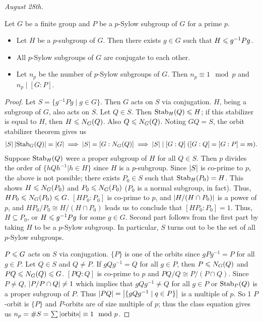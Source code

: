 \textit{August 28th.}

\begin{theorem}
    Let $G$ be a finite group and $P$ be a $p$-Sylow subgroup of $G$ for a prime $p$.
    \begin{itemize}
        \item Let $H$ be a $p$-subgroup of $G$. Then there exists $g \in G$ such that $H \leqslant g^{-1}Pg$.
        \item All $p$-Sylow subgroups of $G$ are conjugate to each other.
        \item Let $n_{p}$ be the number of $p$-Sylow subgroups of $G$. Then $n_{p} \equiv 1 \mod p$ and $n_{p} \mid [G:P]$.
    \end{itemize}
\end{theorem}

\begin{proof}
    Let $S = \{g^{-1}Pg \mid g \in G \}$. Then $G$ acts on $S$ via conjugation. $H$, being a subgroup of $G$, also acts on $S$. Let $Q \in S$. Then $\operatorname{Stab}_{H}(Q) \leqslant H$; if this stabilizer is equal to $H$, then $H \leqslant N_{G}(Q)$. Also $Q \leqslant N_{G}(Q)$. Noting $GQ = S$, the orbit stabilizer theorem gives us
    \begin{align}
        \left| S \right|\left| \operatorname{Stab}_{G}(Q) \right| = \left| G \right| \implies \left| S \right| = [G:N_{G}(Q)] \implies \left| S \right| \mid [G:Q] \;([G:Q]=[G:P] = m).
    \end{align}
    Suppose $\operatorname{Stab}_{H}(Q)$ were a proper subgroup of $H$ for all $Q \in S$. Then $p$ divides the order of $\{hQh^{-1}|h \in H\}$ since $H$ is a $p$-subgroup. Since $\left| S \right|$ is co-prime to $p$, the above is not possible; there exists $P_{0} \in S$ such that $\operatorname{Stab}_{H}(P_{0}) = H$. This shows $H \leqslant N_{G}(P_{0})$ and $P_{0} \leqslant N_{G}(P_{0})$ ($P_{0}$ is a normal subgroup, in fact). Thus, $HP_{0} \leqslant N_{G}(P_{0}) \leqslant G$. $[HP_{0}:P_{0}]$ is co-prime to $p$, and $\left| H/(H \cap P_{0}) \right|$ is a power of $p$, and $HP_{0}/P_{0} \cong H/(H \cap P_{0})$ leads us to conclude that $[HP_{0}:P_{0}] = 1$. Thus, $H \subseteq P_{0}$, or $H \leqslant g^{-1}Pg$ for some $g \in G$. Second part follows from the first part by taking $H$ to be a $p$-Sylow subgroup. In particular, $S$ turns out to be the set of all $p$-Sylow subgroups.

    $P \leqslant G$ acts on $S$ via conjugation. $\{P\}$ is one of the orbits since $gPg^{-1} = P$ for all $g \in P$. Let $Q \in S$ and $Q \neq P$. If $gQg^{-1} = Q$ for all $g \in P$, then $P \leqslant N_{G}(Q)$ and $PQ \leqslant N_{G}(Q) \leqslant G$. $[PQ:Q]$ is co-prime to $p$ and $PQ/Q \cong P/(P \cap Q)$. Since $P \neq Q$, $\left| P/P \cap Q \right| \neq 1$ which implies that $gQg^{-1} \neq Q$ for all $g \in P$ or $\operatorname{Stab}_{P}(Q)$ is a proper subgroup of $P$. Thus $\left| PQ \right| = \left| \{gQg^{-1} \mid q \in P\} \right|$ is a multiple of $p$. So 1 $P$-orbit is $\{P\}$ and $P$-orbits are of size multiple of $p$; thus the class equation gives us $n_{p} = \# S = \sum \left| \text{orbits} \right| \equiv 1 \mod p$.
\end{proof}

